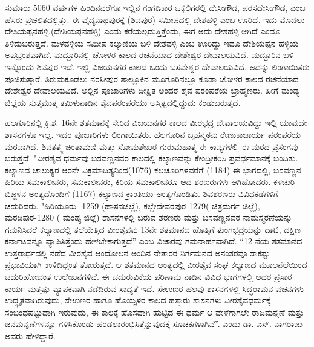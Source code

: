 \vskip -1pt

ಸುಮಾರು 50\enginline{-}60 ವರ್ಷಗಳ ಹಿಂದಿನವರೆಗೂ ಇಲ್ಲಿನ ಗಂಗಡಿಕಾರ ಒಕ್ಕಲಿಗರಲ್ಲಿ ದೇಸೀಗೌಡ, ಪರಸದೇಸೀಗೌಡ, ಎಂಬ ಹೆಸರು ಪ್ರಚಲಿತದಲ್ಲಿತ್ತು. ಈ ವೈದ್ಯನಾಥಪುರಕ್ಕೆ (ಶಿವಪುರ) ಸಮೀಪದಲ್ಲಿ ದೇಶಹಳ್ಳಿ ಎಂಬ ಊರಿದೆ. ಇದು ಮೊದಲು ದೇಸಿಯಪ್ಪನಹಳ್ಳಿ,(ದೇಶಿಯಪ್ಪನಹಳ್ಳಿ) ಎಂದು ಕರೆಯಲ್ಪಡುತ್ತಿತ್ತೆಂದು, ಈಗ ಅದು ದೇಶಹಳ್ಳಿ ಆಗಿದೆ ಎಂದೂ ತಿಳಿದುಬರುತ್ತದೆ. ಮಳವಳ್ಳಿಯ ಸಮೀಪ ಕಲ್ಕುಣಿಯ ಬಳಿ ದೇಶವಳ್ಳಿ ಎಂಬ ಊರಿದ್ದು ಇದೂ ದೇಶಿಯಪ್ಪನ ಹಳ್ಳಿಯ ಅಪಭ್ರಂಶವಾಗಿದೆ. ಮದ್ದೂರಿನಲ್ಲಿ ಚೋಳರ ಕಾಲದ ರಚನೆಯಾದ ದೇಶೇಶ್ವರ ದೇವಾಲಯವಿದೆ. ಮದ್ದೂರಿನ ಬಳಿ ಇನ್ನೊಂದು ಶಿವಪುರ ಇದೆ. ಇಲ್ಲಿ ವಿಜಯನಗರ ಕಾಲದ ಒಂದು ಬಸವೇಶ್ವರ ದೇವಾಲಯವಿದೆ. ಅದನ್ನು ಲಿಂಗಾಯಿತರು ಪೂಜಿಸುತ್ತಾರೆ. ತಿರುಮಕೂಡಲು ನರಸೀಪುರ ತಾಲ್ಲೂಕಿನ ಮೂಗೂರಿನಲ್ಲೂ ಕೂಡಾ ಚೋಳರ ಕಾಲದ ರಚನೆಯಾದ ದೇಶೇಶ್ವರ ದೇವಾಲಯವಿದೆ. ಅಲ್ಲಿನ ಪೂಜಾರಿಗಳು ದೀಕ್ಷಿತ ಅಂದರೆ ಶೈವ ಪರಂಪರೆಯ ಬ್ರಾಹ್ಮಣರು. ಹೀಗೆ ಮಂಡ್ಯ ಜಿಲ್ಲೆಯ ಸುತ್ತಮುತ್ತ ತಮಿಳುನಾಡಿನ ಶೈವಪರಂಪರೆಯು ಅಸ್ತಿತ್ವದಲ್ಲಿದ್ದುದು ಕಂಡುಬರುತ್ತದೆ.

\vskip -1pt

ಹಲಗೂರಿನಲ್ಲಿ ಕ್ರಿ.ಶ. 16ನೇ ಶತಮಾನಕ್ಕೆ ಸೇರಿದ ವಿಜಯನಗರ ಕಾಲದ ವೀರಭದ್ರ ದೇವಾಲಯವಿದ್ದು ಇಲ್ಲಿ ಯಾವುದೇ ಶಾಸನಗಳೂ ಇಲ್ಲ. ಇದರ ಪೂಜಾರಿಗಳು ಲಿಂಗಾಯಿತರು. ಹಲಗೂರಿನ ಬೃಹನ್ಮಠವು ರೇಣುಕಾಚಾರ್ಯ ಪರಂಪರೆಯ ಮಠವಾಗಿದೆ. ಶಿವತತ್ತ್ವ ಚಿಂತಾಮಣಿ ಮತ್ತು ಸೋಮಶೇಖರ ಗುರುಮಹಾತ್ಮ ಈ ಕಾವ್ಯಗಳಲ್ಲಿ ಈ ಮಠದ ಪ್ರಸಂಗವು ಬರುತ್ತದೆ. "ವೀರಶೈವ ಧರ್ಮವು ಬಸವಣ್ಣನವರ ಕಾಲದಲ್ಲಿ ಕಲ್ಯಾಣವನ್ನು ಕೇಂದ್ರೀಕರಿಸಿ ಪ್ರವರ್ಧಮಾನಕ್ಕೆ ಬಂದಿತು. ಕಲ್ಯಾಣದ ಚಾಲುಕ್ಯರ ಆರನೇ ವಿಕ್ರಮಾದಿತ್ಯನಿಂದ(1076) ಕಲಚೂರಿಗಳವರೆಗೆ (1184) ಈ ಭಾಗದಲ್ಲಿ, ಬಸವಣ್ಣನ ಹಿರಿಯ ಸಮಕಾಲೀನರು, ಸಮಕಾಲೀನರು, ಕಿರಿಯ ಸಮಕಾಲೀನರೂ ಆದ ಶರಣರುಗಳು ಆಗಿಹೋದರು. ಕಳಚುರಿ ಬಿಜ್ಜಳನ ಅಂತ್ಯದೊಂದಿಗೆ (1167) ಕಲ್ಯಾಣದ ಕ್ರಾಂತಿಯು ಅಂತ್ಯಗೊಂಡಿತು. ಶಿವಶರಣರು ವಿವಿಧಕಡೆಗಳಿಗೆ ಚದುರಿದರು. "ಹಿರಿಯೂರು -1259 (ಹಾಸನಜಿಲ್ಲೆ), ಕಲ್ಲೇದೇವರಪುರ-1279( ಚಿತ್ರದುರ್ಗ ಜಿಲ್ಲೆ), ಮರಡಿಪುರ-1280 ( ಮಂಡ್ಯ ಜಿಲ್ಲೆ) ಶಾಸನಗಳಲ್ಲಿ ಬರುವ ಶರಣರು ಮತ್ತು ಬಸವಣ್ಣನವರ ನಾಮಸ್ಮರಣೆಯನ್ನು ಗಮನಿಸಿದರೆ ಕಲ್ಯಾಣದಲ್ಲಿ ತಲೆಯೆತ್ತಿದ ವೀರಶೈವವು 13ನೇ ಶತಮಾನದ ಹೊತ್ತಿಗೆ ತುಂಗಭದ್ರೆಯನ್ನು ದಾಟಿ, ದಕ್ಷಿಣ ಕರ್ನಾಟವನ್ನೂ ವ್ಯಾಪಿಸಿತ್ತೆಂದು ಹೇಳಬೇಕಾಗುತ್ತದೆ” ಎಂಬ ವಿಚಾರವು ಗಮನಾರ್ಹವಾಗಿದೆ. “12 ನೆಯ ಶತಮಾನದ ಉತ್ತರಾರ್ಧದಲ್ಲಿ ನಡೆದ ವೀರಶೈವ ಆಂದೋಲನ ಅಂದಿನ ನೇತಾರರ ನಿರ್ಗಮನದ ಅನಂತರವೂ ಸಾಕಷ್ಟು ಪ್ರಭಾವಿಯಾಗಿ ಉಳಿದಿದ್ದಂತೆ ತೋರುತ್ತದೆ. ಆ ಶತಮಾನದ ಅಂತ್ಯದಲ್ಲಿ ವೀರಶೈವ ಸಂಘ ಕಲ್ಯಾಣದ ಮೂಲನೆಲೆಯಿಂದ ಚದುರಿಹೋದಂತೆ ಉಲ್ಲೇಖನಗಳಿವೆ. ಈ ಚದುರುವಿಕೆಯ ಪರಿಣಾಮ ನಾಡಿನ ವಿವಿಧ ಭಾಗಗಳಲ್ಲಿ ಅದರ ಪ್ರಸಾರ ಕಾರ್ಯ ಮತ್ತಷ್ಟು ವ್ಯಾಪಕವಾಗಿ ನಡೆದಿರುವ ಸಾಧ್ಯತೆ ಇದೆ. ಸೇಉಣರ ಹಲವು ಶಾಸನಗಳಲ್ಲಿ ಸಿದ್ಧರಾಮನ ವಚನಗಳು ಉದ್ಧೃತವಾಗಿರುವುದು, ಸೇಉಣರ ಹಾಗೂ ಹೊಯ್ಸಳರ ಕಾಲದ ಹತ್ತಾರು ಶಾಸನಗಳು ವೀರಶೈವಧರ್ಮಕ್ಕೆ ಸಂಬಂಧಪಟ್ಟುದಾಗಿ ಇರುವುದು, ಈ ಕಾಲಕ್ಕೆ ಹೊಸದಾಗಿ ಹುಟ್ಟಿದ ಈ ಧರ್ಮ ಆ ವೇಳೆಗಾಗಲೇ ರಾಜಮನ್ನಣೆ ಮತ್ತು ಜನಮನ್ನಣೆಗಳನ್ನೂ ಗಳಿಸಿಕೊಂಡು ಹರಡಲಾರಂಭಿಸಿತ್ತೆನ್ನುವುದಕ್ಕೆ ಸೂಚಕಗಳಾಗಿವೆ”. ಎಂದು ಡಾ. ಎಸ್​. ನಾಗರಾಜು ಅವರು ಹೇಳಿದ್ದಾರೆ.

